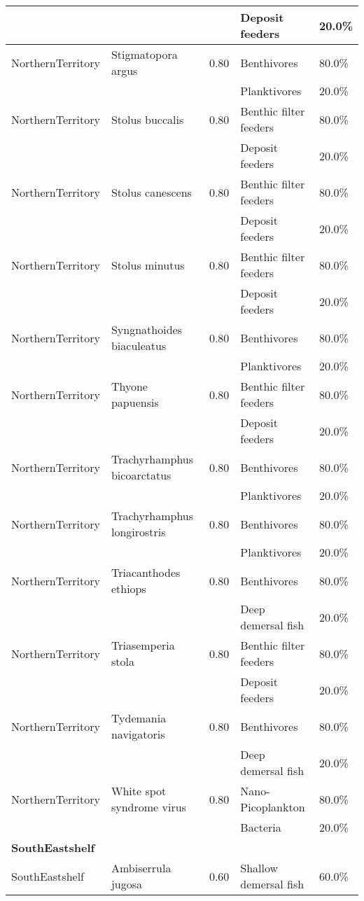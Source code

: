 \begin{longtable}{llcll}
& & & Deposit feeders & 20.0\% \\
\hline
NorthernTerritory & Stigmatopora argus & 0.80 & Benthivores & 80.0\% \\
& & & Planktivores & 20.0\% \\
\hline
NorthernTerritory & Stolus buccalis & 0.80 & Benthic filter feeders & 80.0\% \\
& & & Deposit feeders & 20.0\% \\
\hline
NorthernTerritory & Stolus canescens & 0.80 & Benthic filter feeders & 80.0\% \\
& & & Deposit feeders & 20.0\% \\
\hline
NorthernTerritory & Stolus minutus & 0.80 & Benthic filter feeders & 80.0\% \\
& & & Deposit feeders & 20.0\% \\
\hline
NorthernTerritory & Syngnathoides biaculeatus & 0.80 & Benthivores & 80.0\% \\
& & & Planktivores & 20.0\% \\
\hline
NorthernTerritory & Thyone papuensis & 0.80 & Benthic filter feeders & 80.0\% \\
& & & Deposit feeders & 20.0\% \\
\hline
NorthernTerritory & Trachyrhamphus bicoarctatus & 0.80 & Benthivores & 80.0\% \\
& & & Planktivores & 20.0\% \\
\hline
NorthernTerritory & Trachyrhamphus longirostris & 0.80 & Benthivores & 80.0\% \\
& & & Planktivores & 20.0\% \\
\hline
NorthernTerritory & Triacanthodes ethiops & 0.80 & Benthivores & 80.0\% \\
& & & Deep demersal fish & 20.0\% \\
\hline
NorthernTerritory & Triasemperia stola & 0.80 & Benthic filter feeders & 80.0\% \\
& & & Deposit feeders & 20.0\% \\
\hline
NorthernTerritory & Tydemania navigatoris & 0.80 & Benthivores & 80.0\% \\
& & & Deep demersal fish & 20.0\% \\
\hline
NorthernTerritory & White spot syndrome virus & 0.80 & Nano-Picoplankton & 80.0\% \\
& & & Bacteria & 20.0\% \\
\hline
\hline
\multicolumn{5}{l}{\textbf{SouthEastshelf}} \\
\hline
SouthEastshelf & Ambiserrula jugosa & 0.60 & Shallow demersal fish & 60.0\% \\

\end{longtable}

